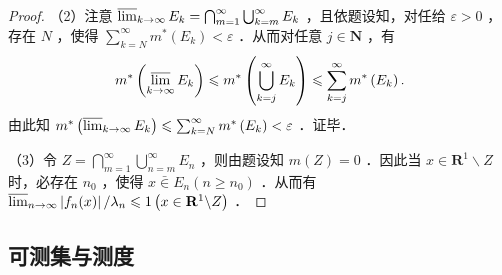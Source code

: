 \begin{proof}
（2）注意 $\varlimsup_{k \rightarrow \infty} E_k=\bigcap_{m=1}^{\infty} \bigcup_{k=m}^{\infty} E_k$ ，且依题设知，对任给 $\varepsilon>0$ ，存在 $N$ ，使得 $\sum_{k=N}^{\infty} m^*\left(E_k\right)<\varepsilon$ ．从而对任意 $j \in \mathbf{N}$ ，有
\[
m^*\left(\varlimsup _{k \rightarrow \infty} E_k\right) \leqslant m^*\left(\bigcup_{k=j}^{\infty} E_k\right) \leqslant \sum_{k=j}^{\infty} m^*\left(E_k\right) .
\]
由此知 $m^*\left(\varlimsup _{k \rightarrow \infty} E_k\right) \leqslant \sum_{k=N}^{\infty} m^*\left(E_k\right)<\varepsilon$ ．证毕．

（3）令 $Z=\bigcap_{m=1}^{\infty} \bigcup_{n=m}^{\infty} E_n$ ，则由题设知 $m(Z)=0$ ．因此当 $x \in \mathbf{R}^1 \backslash Z$ 时，必存在 $n_0$ ，使得 $x \bar{\in} E_n\left(n \geqslant n_0\right)$ ．从而有 $\varlimsup_{n \rightarrow \infty}\left|f_n(x)\right| / \lambda_n \leqslant 1\left(x \in \mathbf{R}^1 \backslash Z\right)$ ．
\end{proof}

\subsection{可测集与测度}

